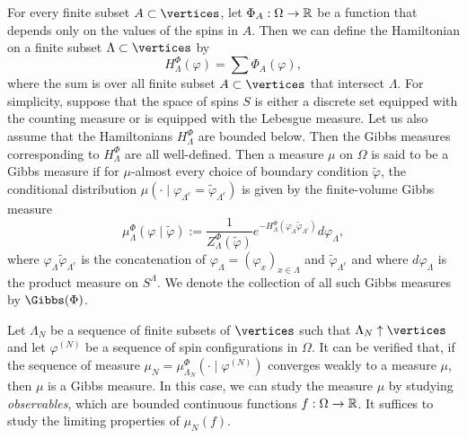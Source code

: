 For every finite subset $A \subset \vertices$, let $\Phi_A : \Omega \rightarrow {\mathbb R}$ be a function that
depends only on the values of the spins in $A$. Then we can define the Hamiltonian on a finite
subset $\Lambda \subset \vertices$ by
\begin{equation}
H^\Phi_\Lambda(\varphi) = \sum \Phi_A(\varphi),
\end{equation}
where the sum is over all finite subset $A \subset \vertices$ that intersect $\Lambda$.
For simplicity, suppose that the space of spins $S$ is either a discrete set equipped with the
counting measure or is equipped with the Lebesgue measure. Let us also assume that the Hamiltonians
$H^\Phi_\Lambda$ are bounded below. Then the  Gibbs measures corresponding to $H^\Phi_\Lambda$ are
all well-defined. Then a measure $\mu$ on $\Omega$ is said to be a Gibbs measure if for $\mu$-almost
every choice of boundary condition $\tilde\varphi$, the conditional distribution
$\mu(\cdot \mid \varphi_{\Lambda^c} = \tilde\varphi_{\Lambda^c})$ is given by the finite-volume Gibbs
measure
\begin{equation}
\mu^\Phi_\Lambda(\varphi \mid \tilde\varphi)
  :=
\frac{1}{Z^\Phi_\Lambda(\tilde\varphi)}
e^{-H^\Phi_\Lambda(\varphi_\Lambda \tilde\varphi_{\Lambda^c})}
d\varphi_\Lambda,
\end{equation}
where $\varphi_\Lambda\tilde\varphi_{\Lambda^c}$ is the concatenation of
$\varphi_\Lambda = (\varphi_x)_{x\in\Lambda}$ and $\tilde\varphi_{\Lambda^c}$
and where $d\varphi_\Lambda$ is the product measure on $S^\Lambda$.
We denote the collection of all such Gibbs measures by $\Gibbs(\Phi)$.

Let $\Lambda_N$ be a sequence of finite subsets of $\vertices$ such that $\Lambda_N \uparrow \vertices$
and let $\varphi^{(N)}$ be a sequence of spin configurations in $\Omega$. It can be verified
that, if the sequence of measure $\mu_N = \mu^\Phi_{\Lambda_N}(\cdot \mid \varphi^{(N)})$ converges weakly
to a measure $\mu$, then $\mu$ is a Gibbs measure. In this case, we can study the measure $\mu$
by studying \emph{observables}, which are bounded continuous functions $f : \Omega \rightarrow {\mathbb R}$. It suffices
to study the limiting properties of $\mu_N(f)$.

